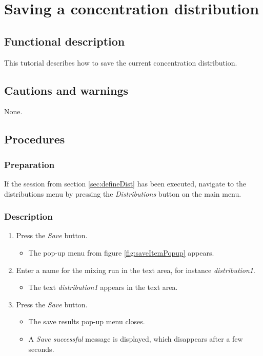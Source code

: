 \section{Saving a concentration distribution}\label{sec:savdist}

\subsection{Functional description}
This tutorial describes how to save the current concentration distribution.

\subsection{Cautions and warnings}
None.

\subsection{Procedures}

\subsubsection{Preparation}
If the session from section \ref{sec:defineDist} has been executed, navigate to the distributions menu by pressing the \emph{Distributions} button on the main menu.

\subsubsection{Description}
\begin{enumerate}
	\item Press the \emph{Save} button.
		\begin{itemize}
			\item The pop-up menu from figure \ref{fig:saveItemPopup} appears.
		\end{itemize}
	\item Enter a name for the mixing run in the text area, for instance \emph{distribution1}.
		\begin{itemize}
			\item The text \emph{distribution1} appears in the text area.
		\end{itemize}
	\item Press the \emph{Save} button.
		\begin{itemize}
			\item The save results pop-up menu closes.
			\item A \emph{Save successful} message is displayed, which disappears after a few seconds.
		\end{itemize}
\end{enumerate}

